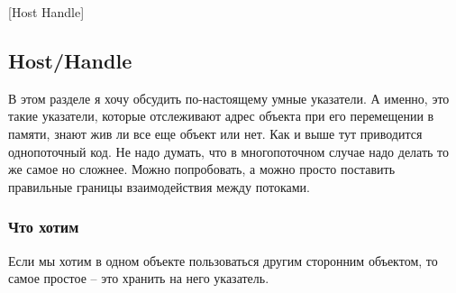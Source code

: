 [Host Handle]


\subsection{Host/Handle}
\label{section::TrackingPtr}

В этом разделе я хочу обсудить по-настоящему умные указатели.
А именно, это такие указатели, которые отслеживают адрес объекта при его перемещении в памяти, знают жив ли все еще объект или нет.
Как и выше тут приводится однопоточный код.
Не надо думать, что в многопоточном случае надо делать то же самое но сложнее.
Можно попробовать, а можно просто поставить правильные границы взаимодействия между потоками.

\subsubsection{Что хотим}

Если мы хотим в одном объекте пользоваться другим сторонним объектом, то самое простое -- это хранить на него указатель.

